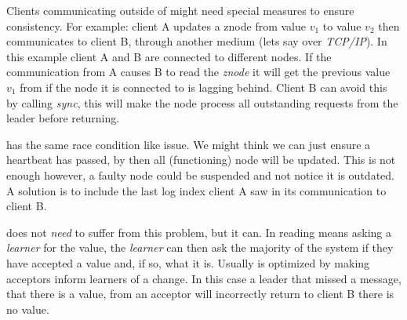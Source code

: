 Clients communicating outside of \zookeeper{} might need special measures to ensure consistency. For example: client A updates a znode from value $v_1$ to value $v_2$ then communicates to client B, through another medium (lets say over \textsl{TCP/IP}). In this example client A and B are connected to different \zookeeper{} nodes. If the communication from A causes B to read the \textsl{znode} it will get the previous value $v_1$ from \zookeeper{} if the node it is connected to is lagging behind. Client B can avoid this by calling \textit{sync}, this will make the \zookeeper{} node process all outstanding requests from the leader before returning.

\raft{} has the same race condition like issue. We might think we can just ensure a heartbeat has passed, by then all (functioning) node will be updated. This is not enough however, a faulty node could be suspended and not notice it is outdated. A solution is to include the last log index client A saw in its communication to client B. 

\paxos{} does not \textit{need} to suffer from this problem, but it can. In \paxos{} reading means asking a \textit{learner} for the value, the \textit{learner} can then ask the majority of the system if they have accepted a value and, if so, what it is. Usually \paxos{} is optimized by making acceptors inform learners of a change. In this case a leader that missed a message, that there is a value, from an acceptor will incorrectly return to client B there is no value.

